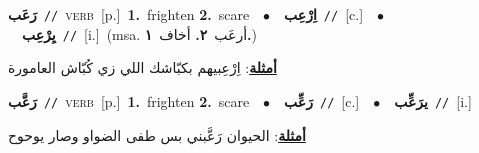 \documentclass[10pt,a4paper,twoside]{article} %
\begin{document}
\begin{multicols}{2}
{\setlength\topsep{0pt}\textbf{\foreignlanguage{arabic}{رَعَب}}\ {\color{gray}\texttt{//}\color{black}}\ \textsc{verb}\ [p.]\ \textbf{1.}~frighten  \textbf{2.}~scare\ \ $\bullet$\ \ \setlength\topsep{0pt}\textbf{\foreignlanguage{arabic}{اِرْعِب}}\ {\color{gray}\texttt{//}\color{black}}\ [c.]\ \ $\bullet$\ \ \setlength\topsep{0pt}\textbf{\foreignlanguage{arabic}{يِرْعِب}}\ {\color{gray}\texttt{//}\color{black}}\ [i.]\ \color{gray}(msa. \foreignlanguage{arabic}{أرعَب}~\foreignlanguage{arabic}{\textbf{٢.}}  \foreignlanguage{arabic}{أخاف}~\foreignlanguage{arabic}{\textbf{١.}})\color{black}\  \begin{flushright}\color{gray}\foreignlanguage{arabic}{\textbf{\underline{\foreignlanguage{arabic}{أمثلة}}}: اِرْعِبيهم بكبّاشك اللي زي كُبّاش العامورة}\end{flushright}\color{black}} \vspace{2mm}

{\setlength\topsep{0pt}\textbf{\foreignlanguage{arabic}{رَعَّب}}\ {\color{gray}\texttt{//}\color{black}}\ \textsc{verb}\ [p.]\ \textbf{1.}~frighten  \textbf{2.}~scare\ \ $\bullet$\ \ \setlength\topsep{0pt}\textbf{\foreignlanguage{arabic}{رَعِّب}}\ {\color{gray}\texttt{//}\color{black}}\ [c.]\ \ $\bullet$\ \ \setlength\topsep{0pt}\textbf{\foreignlanguage{arabic}{يرَعِّب}}\ {\color{gray}\texttt{//}\color{black}}\ [i.]\  \begin{flushright}\color{gray}\foreignlanguage{arabic}{\textbf{\underline{\foreignlanguage{arabic}{أمثلة}}}: الحيوان رَعَّبني بس طفى الضواو وصار يوحوح}\end{flushright}\color{black}} \vspace{2mm}


\end{multicols}
\end{document}
